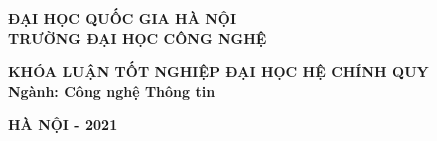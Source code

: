\documentclass[../../../thesis]{subfiles}
\begin{document}
\begin{titlepage}

    \begin{center}
        \textbf{
            ĐẠI HỌC QUỐC GIA HÀ NỘI\\
            TRƯỜNG ĐẠI HỌC CÔNG NGHỆ
        }

        \vspace{60pt}

        

        \vspace{20pt}

        \makeatletter

        \textbf{\large \@author}

        \vspace{60pt}

        \textbf{\LARGE \@title}

        \makeatother

        \vspace{60pt}

        \textbf{\large
            KHÓA LUẬN TỐT NGHIỆP ĐẠI HỌC HỆ CHÍNH QUY\\
            Ngành: Công nghệ Thông tin
        }

        \vspace*{\fill}

        \textbf{HÀ NỘI - 2021}
    \end{center}

\end{titlepage}
\end{document}
